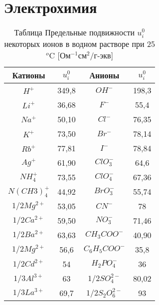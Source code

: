 \section*{Электрохимия}
\begin{longtable}[h]{|c|c|c|c|}
\caption{Таблица Предельные подвижности $u^{0}_{i}$ некоторых ионов в водном растворе при 25$^{o}$C [Ом$^{-1}$см$^{2}$/г-экв]}\\
\hline
Катионы	 & $u^{0}_{i}$ & Анионы &$u^{0}_{i}$ \\
\hline\endfirsthead
\endhead
$H^{+}$ & 349,8 & $OH^{-}$ & 198,3 \\
\hline 
$Li^{+}$ & 36,68 & $F^{-}$ & 55,4 \\
\hline 
$Na^{+}$ & 50,10 & $Cl^{-}$ & 76,35 \\
\hline 
$K^{+}$ & 73,50 & $Br^{-}$ & 78,14 \\
\hline 
$Rb^{+}$ & 77,81 & $I^{-}$ & 78,84 \\
\hline 
$Ag^{+}$ & 61,90 & $ClO_{3}^{-}$ & 64,6 \\
\hline 
$NH_{4}^{+}$ & 73,55 & $ClO_{4}^{-}$ & 67,36 \\
\hline 
$N(CH3)_{4}^{+}$ & 44,92 & $BrO_{3}^{-}$ & 55,74 \\
\hline 
$1/2 Mg^{2+}$ & 53,05 & $CN^{-}$ & 78 \\
\hline 
$1/2 Ca^{2+}$ & 59,50 & $NO_{3}^{-}$ & 71,46 \\
\hline 
$1/2 Ba^{2+}$ & 63,63 & $CH_{3}COO^{-}$ & 40,90 \\
\hline 
$1/2 Mg^{2+}$ & 56,6 & $C_{6}H_{5}COO^{-}$ & 35,8 \\
\hline 
$1/2 Cd^{2+}$ & 54 & $H_{2}PO_{4}^{-}$ & 36 \\
\hline 
$1/3 Al^{3+}$ & 63 & $1/2 SO_{4}^{2-}$ & 80,02 \\
\hline 
$1/3 La^{3+}$ & 69,7 & $1/2 S_{2}O_{6}^{2-}$ & 93 \\
\hline 
\end{longtable}
\newpage
